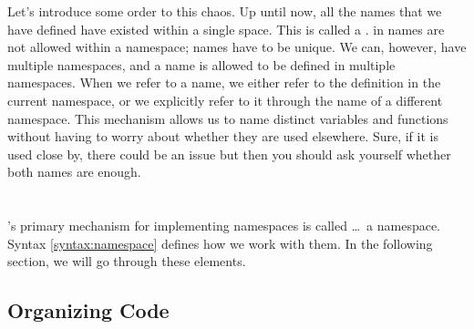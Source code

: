 Let's introduce some order to this chaos. Up until now, all the names that we have defined have existed within a single space. This is called a .  in names are not allowed within a namespace; names have to be unique. We can, however, have multiple namespaces, and a name is allowed to be defined in multiple namespaces. When we refer to a name, we either refer to the definition in the current namespace, or we explicitly refer to it through the name of a different namespace. This mechanism allows us to name distinct variables and functions without having to worry about whether they are used elsewhere. Sure, if it is used close by, there could be an issue but then you should ask yourself whether both names are  enough.

\section{\csharp}

\csharp's primary mechanism for implementing namespaces is called \ldots\ a namespace. Syntax \ref{syntax:namespace} defines how we work with them. In the following section, we will go through these elements.

\begin{syntaxfloat}
  
  \caption{Namespaces}
  \label{syntax:namespace}
\end{syntaxfloat}


\subsection{Organizing Code} %

